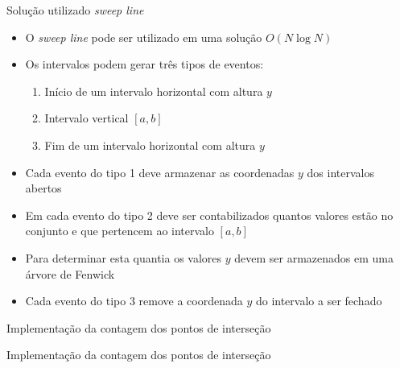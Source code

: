 \begin{frame}[fragile]{Solução utilizado \textit{sweep line}}

    \begin{itemize}
        \item O \textit{sweep line} pode ser utilizado em uma solução $O(N\log N)$
        \pause

        \item Os intervalos podem gerar três tipos de eventos:
        \pause
        \begin{enumerate}
            \item Início de um intervalo horizontal com altura $y$
        \pause
            \item Intervalo vertical $[a, b]$
        \pause
            \item Fim de um intervalo horizontal com altura $y$
        \pause
        \end{enumerate}

        \item Cada evento do tipo 1 deve armazenar as coordenadas $y$ dos intervalos abertos
        \pause

        \item Em cada evento do tipo 2 deve ser contabilizados quantos valores estão no conjunto
            e que pertencem ao intervalo $[a, b]$
        \pause

        \item Para determinar esta quantia os valores $y$ devem ser armazenados em uma árvore
            de Fenwick
        \pause

        \item Cada evento do tipo 3 remove a coordenada $y$ do intervalo a ser fechado
            
    \end{itemize}

\end{frame}



\begin{frame}[fragile]{Implementação da contagem dos pontos de interseção}
\end{frame}

\begin{frame}[fragile]{Implementação da contagem dos pontos de interseção}
\end{frame}


